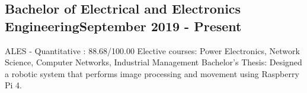 \vspace*{10pt}
\subsection{{Bachelor of Electrical and Electronics Engineering}\hfill September 2019 - Present}
\vspace*{5pt}
ALES - Quantitative : 88.68/100.00 \newline
Elective courses: Power Electronics, Network Science, Computer Networks, Industrial Management \newline
Bachelor's Thesis: Designed a robotic system that performs image processing and movement using Raspberry Pi 4.
